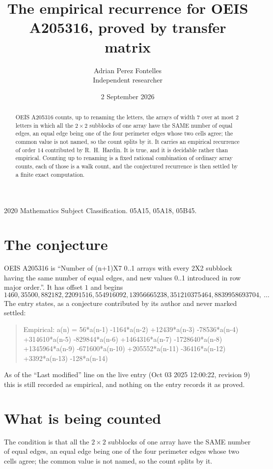 \documentclass[11pt,a4paper]{article}
\title{The empirical recurrence for OEIS A205316, proved by transfer matrix}
\author{Adrian Perez Fontelles\\ \small Independent researcher}
\date{2 September 2026}
\theoremstyle{plain}
\theoremstyle{definition}
\begin{document}
\maketitle

\begin{abstract}
OEIS A205316 counts, up to renaming the letters, the arrays of width $7$ over at most $2$
letters in which all the $2\times2$ subblocks of one array have the SAME number of equal edges, an equal edge being one of the four perimeter edges whose two cells agree; the common value is not named, so the count splits by it. It carries an empirical recurrence of order $14$ contributed by
R.~H.~Hardin. It is true, and it is decidable rather than empirical. Counting up to renaming is
a fixed rational combination of ordinary array counts, each of those is a walk count, and the
conjectured recurrence is then settled by a finite exact computation.
\end{abstract}

\noindent\small 2020 Mathematics Subject Classification. 05A15, 05A18, 05B45.\normalsize

\section{The conjecture}

OEIS A205316 is ``Number of (n+1)X7 0..1 arrays with every 2X2 subblock having the same number of equal edges, and new values 0..1 introduced in row major order.''. It has offset $1$ and begins
\[
1460, 35500, 882182, 22091516, 554916092, 13956665238, 351210375464, 8839958693704,\ \dots
\]
The entry states, as a conjecture contributed by its author and never marked settled:
\begin{quote}
Empirical: a(n) = 56*a(n-1) -1164*a(n-2) +12439*a(n-3) -78536*a(n-4) +314610*a(n-5) -829844*a(n-6) +1464316*a(n-7) -1728640*a(n-8) +1345964*a(n-9) -671600*a(n-10) +205552*a(n-11) -36416*a(n-12) +3392*a(n-13) -128*a(n-14)
\end{quote}
As of the ``Last modified'' line on the live entry (Oct 03 2025 12:00:22, revision 9) this is still
recorded as empirical, and nothing on the entry records it as proved.

\section{What is being counted}

The condition is that all the $2\times2$ subblocks of one array have the SAME number of equal edges, an equal edge being one of the four perimeter edges whose two cells agree; the common value is not named, so the count splits by it.
\end{document}
